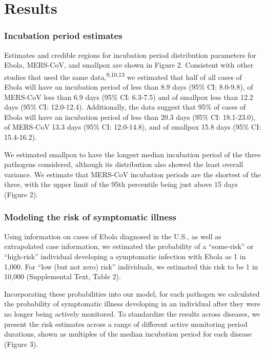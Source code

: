\documentclass[]{article}
\begin{document}
\section{Results}\label{results}

\subsubsection{Incubation period
estimates}\label{incubation-period-estimates}

Estimates and credible regions for incubation period distribution
parameters for Ebola, MERS-CoV, and smallpox are shown in Figure 2.
Consistent with other studies that used the same
data,\textsuperscript{9,10,13} we estimated that half of all cases of
Ebola will have an incubation period of less than 8.9 days (95\% CI:
8.0-9.8), of MERS-CoV less than 6.9 days (95\% CI: 6.3-7.5) and of
smallpox less than 12.2 days (95\% CI: 12.0-12.4). Additionally, the
data suggest that 95\% of cases of Ebola will have an incubation period
of less than 20.3 days (95\% CI: 18.1-23.0), of MERS-CoV 13.3 days (95\%
CI: 12.0-14.8), and of smallpox 15.8 days (95\% CI: 15.4-16.2).

We estimated smallpox to have the longest median incubation period of
the three pathogens considered, although its distribution also showed
the least overall variance. We estimate that MERS-CoV incubation periods
are the shortest of the three, with the upper limit of the 95th
percentile being just above 15 days (Figure 2).

\subsubsection{Modeling the risk of symptomatic
illness}\label{modeling-the-risk-of-symptomatic-illness}

Using information on cases of Ebola diagnosed in the U.S., as well as
extrapolated case information, we estimated the probability of a
``some-risk'' or ``high-risk'' individual developing a symptomatic
infection with Ebola as 1 in 1,000. For ``low (but not zero) risk''
individuals, we estimated this risk to be 1 in 10,000 (Supplemental
Text, Table 2).

Incorporating these probabilities into our model, for each pathogen we
calculated the probability of symptomatic illness developing in an
individual after they were no longer being actively monitored. To
standardize the results across diseases, we present the risk estimates
across a range of different active monitoring period durations, shown as
multiples of the median incubation period for each disease (Figure 3).
\end{document}
